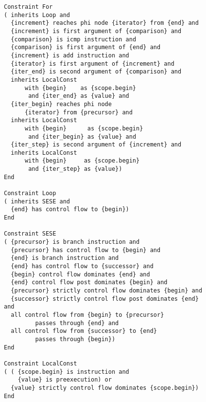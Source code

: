 \begin{figure}[p]
\begin{lstlisting}[language=IDL,basicstyle=\linespread{0.8}\ttfamily,
                   firstnumber=140]
Constraint For
( inherits Loop and
  {increment} reaches phi node {iterator} from {end} and
  {increment} is first argument of {comparison} and
  {comparison} is icmp instruction and
  {comparison} is first argument of {end} and
  {increment} is add instruction and
  {iterator} is first argument of {increment} and
  {iter_end} is second argument of {comparison} and
  inherits LocalConst
      with {begin}    as {scope.begin}
       and {iter_end} as {value} and
  {iter_begin} reaches phi node
      {iterator} from {precursor} and
  inherits LocalConst
      with {begin}      as {scope.begin}
       and {iter_begin} as {value} and
  {iter_step} is second argument of {increment} and
  inherits LocalConst
      with {begin}     as {scope.begin}
       and {iter_step} as {value})
End

Constraint Loop
( inherits SESE and
  {end} has control flow to {begin})
End

Constraint SESE
( {precursor} is branch instruction and
  {precursor} has control flow to {begin} and
  {end} is branch instruction and
  {end} has control flow to {successor} and
  {begin} control flow dominates {end} and
  {end} control flow post dominates {begin} and
  {precursor} strictly control flow dominates {begin} and
  {successor} strictly control flow post dominates {end} and
  all control flow from {begin} to {precursor}
         passes through {end} and
  all control flow from {successor} to {end}
         passes through {begin})
End

Constraint LocalConst
( ( {scope.begin} is instruction and
    {value} is preexecution) or
  {value} strictly control flow dominates {scope.begin})
End
\end{lstlisting}
\end{figure}
